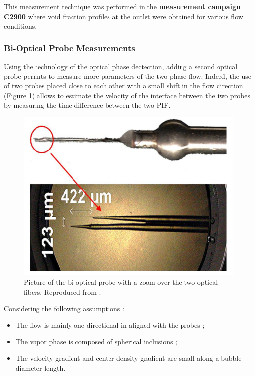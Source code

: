 \begin{remark*}{}
This measurement technique was performed in the \textbf{measurement campaign C2900} where void fraction profiles at the outlet were obtained for various flow conditions.
\end{remark*}

\subsubsection{Bi-Optical Probe Measurements}


Using the technology of the optical phase dectection, adding a second optical probe permits to measure more parameters of the two-phase flow. Indeed, the use of two probes placed close to each other with a small shift in the flow direction (Figure \ref{fig:optical_probe}) allows to estimate the velocity of the interface between the two probes by measuring the time difference between the two PIF.


\begin{figure}[!h]
\centering
\includegraphics[width=0.65\linewidth]{img/DEBORA/optical_probe.png}
\caption{Picture of the bi-optical probe with a zoom over the two optical fibers. Reproduced from \cite{gueguen_phd}.}
\label{fig:optical_probe}
\end{figure}

\npar

Considering the following assumptions :

\begin{itemize}
\item The flow is mainly one-directional in aligned with the probes ;
\item The vapor phase is composed of spherical inclusions ;
\item The velocity gradient and center density gradient are small along a bubble diameter length.
\end{itemize}


